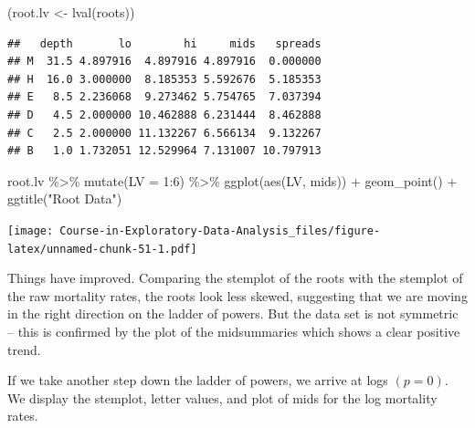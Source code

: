 \documentclass[
]{book}
\newenvironment{Shaded}{\begin{snugshade}}{\end{snugshade}}
\newcommand{\AttributeTok}[1]{\textcolor[rgb]{0.77,0.63,0.00}{#1}}
\newcommand{\DecValTok}[1]{\textcolor[rgb]{0.00,0.00,0.81}{#1}}
\newcommand{\FunctionTok}[1]{\textcolor[rgb]{0.00,0.00,0.00}{#1}}
\newcommand{\NormalTok}[1]{#1}
\newcommand{\OtherTok}[1]{\textcolor[rgb]{0.56,0.35,0.01}{#1}}
\newcommand{\SpecialCharTok}[1]{\textcolor[rgb]{0.00,0.00,0.00}{#1}}
\newcommand{\StringTok}[1]{\textcolor[rgb]{0.31,0.60,0.02}{#1}}
\begin{document}
\begin{Shaded}
\begin{Highlighting}[]
\NormalTok{(root.lv }\OtherTok{\textless{}{-}} \FunctionTok{lval}\NormalTok{(roots))}
\end{Highlighting}
\end{Shaded}

\begin{verbatim}
##   depth       lo        hi     mids   spreads
## M  31.5 4.897916  4.897916 4.897916  0.000000
## H  16.0 3.000000  8.185353 5.592676  5.185353
## E   8.5 2.236068  9.273462 5.754765  7.037394
## D   4.5 2.000000 10.462888 6.231444  8.462888
## C   2.5 2.000000 11.132267 6.566134  9.132267
## B   1.0 1.732051 12.529964 7.131007 10.797913
\end{verbatim}

\begin{Shaded}
\begin{Highlighting}[]
\NormalTok{root.lv }\SpecialCharTok{\%\textgreater{}\%} \FunctionTok{mutate}\NormalTok{(}\AttributeTok{LV =} \DecValTok{1}\SpecialCharTok{:}\DecValTok{6}\NormalTok{) }\SpecialCharTok{\%\textgreater{}\%} 
  \FunctionTok{ggplot}\NormalTok{(}\FunctionTok{aes}\NormalTok{(LV, mids)) }\SpecialCharTok{+}
  \FunctionTok{geom\_point}\NormalTok{() }\SpecialCharTok{+} \FunctionTok{ggtitle}\NormalTok{(}\StringTok{"Root Data"}\NormalTok{)}
\end{Highlighting}
\end{Shaded}

\texttt{[image: Course-in-Exploratory-Data-Analysis\_files/figure-latex/unnamed-chunk-51-1.pdf]}

Things have improved. Comparing the stemplot of the roots with the stemplot of the raw mortality rates, the roots look less skewed, suggesting that we are moving in the right direction on the ladder of powers. But the data set is not symmetric -- this is confirmed by the plot of the midsummaries which shows a clear positive trend.

If we take another step down the ladder of powers, we arrive at logs \((p = 0)\). We display the stemplot, letter values, and plot of mids for the log mortality rates.

\begin{Shaded}
\end{Shaded}
\end{document}
